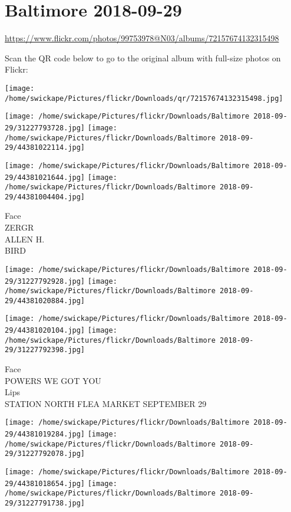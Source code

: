 \documentclass[10pt,letterpaper]{article}
\title{}
\author{}
\date{}
\begin{document}
\section*{Baltimore 2018-09-29}

\url{https://www.flickr.com/photos/99753978@N03/albums/72157674132315498}

Scan the QR code below to go to the original album with full-size photos on Flickr:

\texttt{[image: /home/swickape/Pictures/flickr/Downloads/qr/72157674132315498.jpg]}
\pagebreak

\texttt{[image: /home/swickape/Pictures/flickr/Downloads/Baltimore 2018-09-29/31227793728.jpg]}
\texttt{[image: /home/swickape/Pictures/flickr/Downloads/Baltimore 2018-09-29/44381022114.jpg]}

\texttt{[image: /home/swickape/Pictures/flickr/Downloads/Baltimore 2018-09-29/44381021644.jpg]}
\texttt{[image: /home/swickape/Pictures/flickr/Downloads/Baltimore 2018-09-29/44381004404.jpg]}

Face\\
ZERGR\\
ALLEN H.\\
BIRD
\pagebreak

\texttt{[image: /home/swickape/Pictures/flickr/Downloads/Baltimore 2018-09-29/31227792928.jpg]}
\texttt{[image: /home/swickape/Pictures/flickr/Downloads/Baltimore 2018-09-29/44381020884.jpg]}

\texttt{[image: /home/swickape/Pictures/flickr/Downloads/Baltimore 2018-09-29/44381020104.jpg]}
\texttt{[image: /home/swickape/Pictures/flickr/Downloads/Baltimore 2018-09-29/31227792398.jpg]}

Face\\
POWERS WE GOT YOU\\
Lips\\
STATION NORTH FLEA MARKET SEPTEMBER 29
\pagebreak

\texttt{[image: /home/swickape/Pictures/flickr/Downloads/Baltimore 2018-09-29/44381019284.jpg]}
\texttt{[image: /home/swickape/Pictures/flickr/Downloads/Baltimore 2018-09-29/31227792078.jpg]}

\texttt{[image: /home/swickape/Pictures/flickr/Downloads/Baltimore 2018-09-29/44381018654.jpg]}
\texttt{[image: /home/swickape/Pictures/flickr/Downloads/Baltimore 2018-09-29/31227791738.jpg]}
\end{document}
